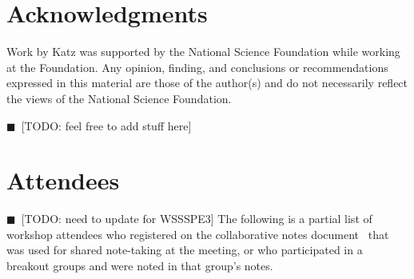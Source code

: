 \documentclass[11pt, oneside]{amsart}
\newcommand{\todo}[1]{{\color{blue}$\blacksquare$~\textsf{[TODO: #1]}}}
\begin{document}
\section*{Acknowledgments} \label{sec:acks}

Work by Katz was supported by the National Science Foundation while working at
the Foundation. Any opinion, finding, and conclusions or recommendations
expressed in this material are those of the author(s) and do not necessarily
reflect the views of the National Science Foundation.

\todo{feel free to add stuff here}


\appendix
\section{Attendees}  \label{sec:attendees}
\todo{need to update for WSSSPE3}
The following is a partial list of workshop attendees who registered on the
collaborative notes document~\cite{WSSSPE2-google-notes} that was used
for shared note-taking at the meeting, or who participated in a breakout groups
and were noted in that group's notes.
\end{document}

